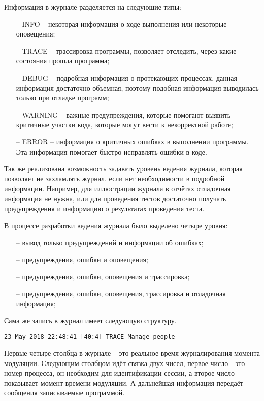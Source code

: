 		Информация в журнале разделяется на следующие типы:
			\begin{itemize}
				\item[--] INFO -- некоторая информация о ходе выполнения или некоторые оповещения;
				\item[--] TRACE -- трассировка программы, позволяет отследить, через какие состояния прошла программа;
				\item[--] DEBUG -- подробная информация о протекающих процессах, данная информация достаточно объемная,
					поэтому подобная информация выводилась только при отладке программ;
				\item[--] WARNING -- важные предупреждения, которые помогают выявить критичные участки кода,
					которые могут вести к некорректной работе;
				\item[--] ERROR -- информация о критичных ошибках в выполнении программы. Эта информация помогает
					быстро исправлять ошибки в коде.
			\end{itemize}

		Так же реализована возможность задавать уровень ведения журнала, которая позволяет не захламлять журнал,
			если нет необходимости в подробной информации. Например, для иллюстрации журнала в отчётах
			отладочная информация не нужна, или для проведения тестов достаточно получать предупреждения
			и информацию о результатах проведения теста.

		В процессе разработки ведения журнала было выделено четыре уровня:
			\begin{itemize}
				\item[--] вывод только предупреждений и информации об ошибках;
				\item[--] предупреждения, ошибки и оповещения;
				\item[--] предупреждения, ошибки, оповещения и трассировка;
				\item[--] предупреждения, ошибки, оповещения, трассировка и отладочная информация;
			\end{itemize}

		Сама же запись в журнал имеет следующую структуру.
\begin{lstlisting}
23 May 2018 22:48:41 [40:4] TRACE Manage people
\end{lstlisting}
		Первые четыре столбца в журнале -- это реальное время журналирования момента модуляции.
		Следующим столбцом идёт связка двух чисел, первое число - это номер процесса,
		он необходим для идентификации сессии, а второе число показывает момент времени модуляции.
		А дальнейшая информация передаёт сообщения записываемые программой.

